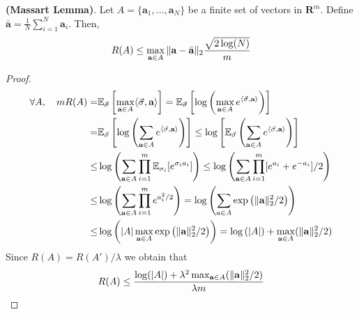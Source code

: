 \begin{lemma}
    \textbf{(Massart Lemma)}.
    Let $ A = \{ \mathbf{a}_1, \ldots, \mathbf{a}_N \} $ be a finite set of vectors in $ \mathbf{R}^m $.
    Define $ \bar{ \mathbf{a}} = \frac{1}{N} \sum^{N}_{i=1} \mathbf{a}_i $. Then,
    \begin{equation}
        R(A) \le \max_{\mathbf{a} \in A} \Arrowvert \mathbf{a} - \bar{\mathbf{a}} \Arrowvert_2
        \frac{\sqrt{2\log(N)}}{m} 
    \end{equation}
    \begin{proof}
        \begin{align*}
            \forall A,\quad
            m R(A) =& \mathbb{E}_{\vec\sigma} \left[ \max_{\mathbf{a}\in A } \langle \vec \sigma, \textbf{a} \rangle \right]
            = \mathbb{E}_{\vec\sigma}\left[ \log \left(  \max_{\mathbf{a}\in A } e^{\langle \vec \sigma, \textbf{a} \rangle } \right) \right]\\
            =& \mathbb{E}_{\vec\sigma}\left[ \log \left(  \sum_{\mathbf{a}\in A } e^{\langle \vec \sigma, \textbf{a} \rangle } \right) \right]
            \le \log \left[ \mathbb{E}_{\vec\sigma} \left(  \sum_{\mathbf{a}\in A } e^{\langle \vec \sigma, \textbf{a} \rangle } \right) \right] \\
            \le& \log \left(  \sum_{\mathbf{a}\in A } \prod^m_{i=1} \mathbb{E}_{\sigma_i} [e^{\sigma_i a_i}] \right) 
            \le \log \left(  \sum_{\mathbf{a}\in A } \prod^m_{i=1} [e^{a_i} + e^{-a_i}]/2 \right) \\
            \le& \log \left(  \sum_{\mathbf{a}\in A } \prod^m_{i=1} e^{a_i^2/2} \right) 
            = \log \left( \sum^{}_{a \in A} \exp \left( \Arrowvert \mathbf{a} \Arrowvert_2^2/2 \right) \right)\\
            \le& \log \left( \left| A \right| \max_{\mathbf{a} \in A} \exp \left( \Arrowvert \mathbf{a} \Arrowvert_2^2/2 \right) \right) = \log \left( \left| A \right| \right) + \max_{\mathbf{a} \in A } (\Arrowvert \mathbf{a} \Arrowvert_2^2 /2)
        \end{align*}
        Since $ R(A) = R(A')/\lambda $ we obtain that
        \[
            R(A) \le \frac{\log(|A|) + \lambda^2 \max_{\mathbf{a} \in A } (\Arrowvert \mathbf{a} \Arrowvert_2^2 /2)}{\lambda m}
        \]
    \end{proof}
\end{lemma}

